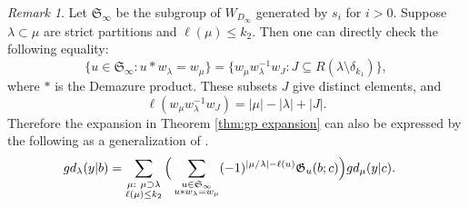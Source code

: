 \documentclass[a4paper]{amsart}
\theoremstyle{remark}
\newtheorem{remark}[thm]{Remark}
\numberwithin{equation}{section}
\begin{document}
\begin{remark}
Let $\mathfrak{S}_\infty$ be the subgroup of $W_{D_\infty}$ generated by $s_i$ for $i>0$. Suppose \(\lambda\subset\mu\) are strict partitions and \(\ell(\mu)\le k_2\). Then one can directly check the following equality:
\[
\{u\in \mathfrak{S}_\infty:u*w_\lambda=w_\mu\}
=
\{w_\mu w_\lambda^{-1}w_J:J\subseteq R(\lambda\setminus \delta_{k_1})\},
\]
where $*$ is the Demazure product. These subsets \(J\) give distinct elements, and
\[
\ell(w_\mu w_\lambda^{-1}w_J)
=
|\mu|-|\lambda|+|J|.
\] 
Therefore the expansion in Theorem \ref{thm:gp expansion} can also be expressed by the following as a generalization of \cite[Proposition 5.36]{LLS}.
\begin{align*}
    gd_\lambda(y| b) &= \sum_{\substack{\mu:~ \mu\supset\lambda\\\ell(\mu)\leq k_2}} \Big( \sum_{\substack{u\in {\mathfrak{S}_\infty} \\ u*w_\lambda=w_\mu}} (-1)^{|\mu/\lambda|-\ell(u)} \mathfrak{G}_u(b;c) \Big)gd_\mu(y| c).
\end{align*}
\end{remark}





\end{document}
